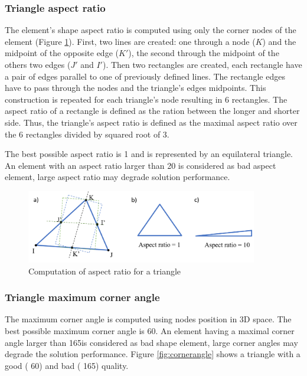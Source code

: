  \subsubsection*{Triangle aspect ratio }
 The element's shape aspect ratio is computed using only the corner nodes of the element (Figure \ref{fig:aspectratio}). First, two lines are created: one through a node ($K$) and the midpoint of the opposite edge ($ K'$), the second through the midpoint of the others two edges ($J'$ and $ I'$). Then two rectangles are created, each rectangle have a pair of edges parallel to one of previously defined lines. The rectangle edges have to pass through the nodes and the triangle's edges midpoints. This construction is repeated for each triangle's node resulting in 6 rectangles. The aspect ratio of a rectangle is defined as the ration between the longer and shorter side. Thus, the triangle's aspect ratio is defined as the maximal aspect ratio over the 6 rectangles divided by squared root of 3. 
 
 The best possible aspect ratio is 1 and is represented by an equilateral triangle. An element with an aspect ratio larger than 20 is considered as bad aspect element, large aspect ratio may degrade solution performance.
 
 \begin{figure}[!h]
\centering
\includegraphics[width=0.9\textwidth,keepaspectratio]{figures/aspectRatio.png} 
\caption{Computation of aspect ratio for a triangle}
\label{fig:aspectratio}
\end{figure}  

\subsubsection*{Triangle maximum corner angle}
The maximum corner angle is computed using nodes position in 3D space. The best possible maximum corner angle is 60\textdegree. An element having a maximal corner angle larger than 165\textdegree is considered as bad shape element, large corner angles may degrade the solution performance. Figure \ref{fig:cornerangle} shows a triangle with a good ( 60\textdegree) and bad ( 165\textdegree) quality. 

